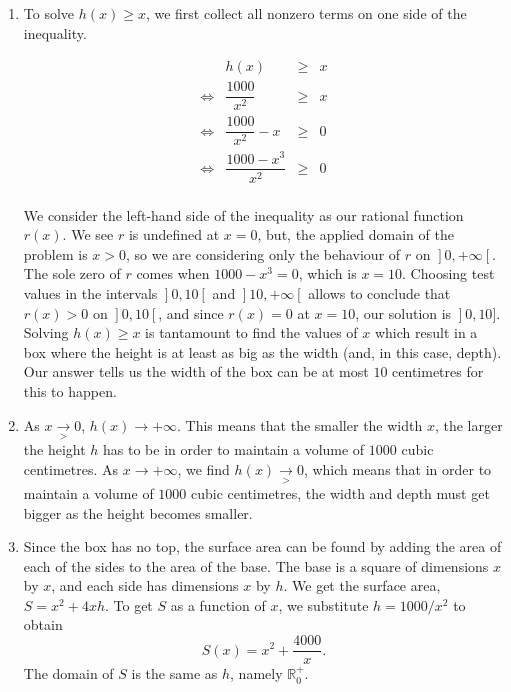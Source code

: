 \begin{example}
\begin{enumerate}
\item  To solve $h(x) \geq x$, we first collect all nonzero terms on one side of the inequality.

\[ \begin{array}{rrcl}

&h(x) & \geq & x  \\ [10pt]

\Leftrightarrow&\dfrac{1000}{x^2} & \geq & x \\ [10pt]

\Leftrightarrow&\dfrac{1000}{x^2} - x & \geq & 0 \\ [10pt]

\Leftrightarrow&\dfrac{1000-x^3}{x^2} & \geq & 0  \\[10pt]

\end{array} \]

We consider the left-hand side of the inequality as our rational function $r(x)$.  We see $r$ is undefined at $x=0$, but, the applied domain of the problem is $x > 0$, so we are considering only the behaviour of $r$ on $\left.\right]0, +\infty\left[\right.$.  The sole zero of $r$ comes when $1000-x^3 = 0$, which is $x=10$.  Choosing test values in the intervals $\left.\right]0,10\left[\right.$ and $\left.\right]10, +\infty\left[\right.$ allows to conclude that  $r(x) > 0$ on $\left.\right]0,10\left[\right.$, and since $r(x) = 0$ at $x=10$, our solution is $\left.\right]0,10]$.   Solving $h(x) \geq x$ is tantamount to find the values of $x$ which result in a box where the height is at least as big as the width (and, in this case, depth).  Our answer tells us the width of the box can be at most $10$ centimetres for this to happen.

\item As $x \underset{>}{\rightarrow} 0$, $h(x) \rightarrow +\infty$.  This means that the smaller the width $x$, the larger the height $h$ has to be in order to maintain a volume of $1000$ cubic centimetres. As $x \rightarrow +\infty$, we find $h(x) \underset{>}{\rightarrow}0$, which means that in order to maintain a volume of $1000$ cubic centimetres, the width and depth must get bigger as the height becomes smaller.

\item  Since the box has no top, the surface area can be found by adding the area of each of the sides to the area of the base.  The base is a square of dimensions $x$ by $x$, and each side has dimensions $x$ by $h$.  We get the surface area, $S = x^2+4xh$.  To get $S$ as a function of $x$, we substitute $h = 1000/x^2$ to obtain
$$S(x) = x^2 + \frac{4000}{x}.$$
The domain of $S$ is the same as $h$, namely $\mathbb{R}^+_0$.

\end{enumerate}
\end{example}
\fi


